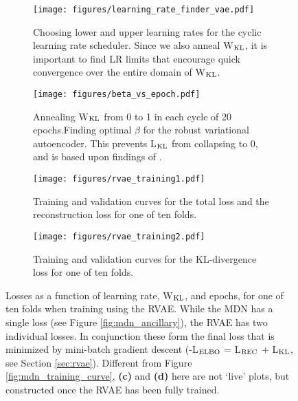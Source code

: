 \begin{figure*}
    \begin{minipage}{.97\textwidth}
        \begin{subfigure}{0.49\textwidth}
            \centering
            \texttt{[image: figures/learning\_rate\_finder\_vae.pdf]}
            \caption{Choosing lower and upper learning rates for the cyclic learning rate scheduler. Since we also anneal W$_{\rm KL}$, it is important to find LR limits that encourage quick convergence over the entire domain of W$_{\rm KL}$.}
            \label{fig:vae_find_lr}
        \end{subfigure}
        \hfill
        \begin{subfigure}{0.49\textwidth}
            \centering
            \texttt{[image: figures/beta\_vs\_epoch.pdf]}
            \caption{Annealing W$_{\rm KL}$ from 0 to 1 in each cycle of 20 epochs.Finding optimal $\beta$ for the robust variational autoencoder. This prevents L$_{\rm KL}$ from collapsing to 0, and is based upon findings of \cite{cyclical_wkl_annealing}.}
            \label{fig:vae_weightkl_vs_epoch}
        \end{subfigure}
        \newline
        \begin{subfigure}{0.49\textwidth}
            \centering
            \texttt{[image: figures/rvae\_training1.pdf]}
            \caption{Training and validation curves for the total loss and the reconstruction loss for one of ten folds.}
            \label{fig:vae_trainingcurve1}
        \end{subfigure}
        \hfill
        \begin{subfigure}{0.49\textwidth}
            \centering
            \texttt{[image: figures/rvae\_training2.pdf]}
            \caption{Training and validation curves for the KL-divergence loss for one of ten folds.}
            \label{fig:vae_trainingcurve2}
        \end{subfigure}
        \caption{Losses as a function of learning rate, W$_{\rm KL}$, and epochs, for one of ten folds when training using the RVAE. While the MDN has a single loss (see Figure \ref{fig:mdn_ancillary}), the RVAE has two individual losses.  In conjunction these form the final loss that is minimized by mini-batch gradient descent (-L$_{\rm ELBO}$ = L$_{\rm REC}$ + L$_{\rm KL}$, see Section \ref{sec:rvae}). Different from Figure \ref{fig:mdn_training_curve}, \textbf{(c)} and \textbf{(d)} here are not `live' plots, but constructed once the RVAE has been fully trained.}
        \label{fig:vae_ancillary}
    \end{minipage}
\end{figure*}   
    


